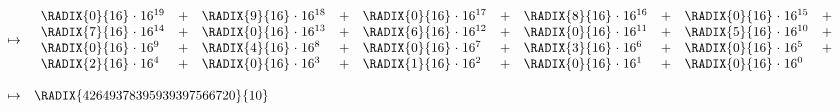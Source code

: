 \begin{itemize}
\[\begin{array}{lcl}
              &\mapsto& \begin{array}{*{5}{l@{\;}c@{\;}lc}}
                        \RADIX{0}{16} &\cdot& 16^{19} &+&
                        \RADIX{9}{16} &\cdot& 16^{18} &+&
                        \RADIX{0}{16} &\cdot& 16^{17} &+&
                        \RADIX{8}{16} &\cdot& 16^{16} &+&
                        \RADIX{0}{16} &\cdot& 16^{15} &+\\
                        \RADIX{7}{16} &\cdot& 16^{14} &+&
                        \RADIX{0}{16} &\cdot& 16^{13} &+&
                        \RADIX{6}{16} &\cdot& 16^{12} &+&
                        \RADIX{0}{16} &\cdot& 16^{11} &+&
                        \RADIX{5}{16} &\cdot& 16^{10} &+\\
                        \RADIX{0}{16} &\cdot& 16^{ 9} &+&
                        \RADIX{4}{16} &\cdot& 16^{ 8} &+&
                        \RADIX{0}{16} &\cdot& 16^{ 7} &+&
                        \RADIX{3}{16} &\cdot& 16^{ 6} &+&
                        \RADIX{0}{16} &\cdot& 16^{ 5} &+\\
                        \RADIX{2}{16} &\cdot& 16^{ 4} &+&
                        \RADIX{0}{16} &\cdot& 16^{ 3} &+&
                        \RADIX{1}{16} &\cdot& 16^{ 2} &+&
                        \RADIX{0}{16} &\cdot& 16^{ 1} &+&
                        \RADIX{0}{16} &\cdot& 16^{ 0} & \\
                        \end{array}                     \\\\
              &\mapsto& \RADIX{42649378395939397566720}{10}
      \end{array}
      \]
\end{itemize}
